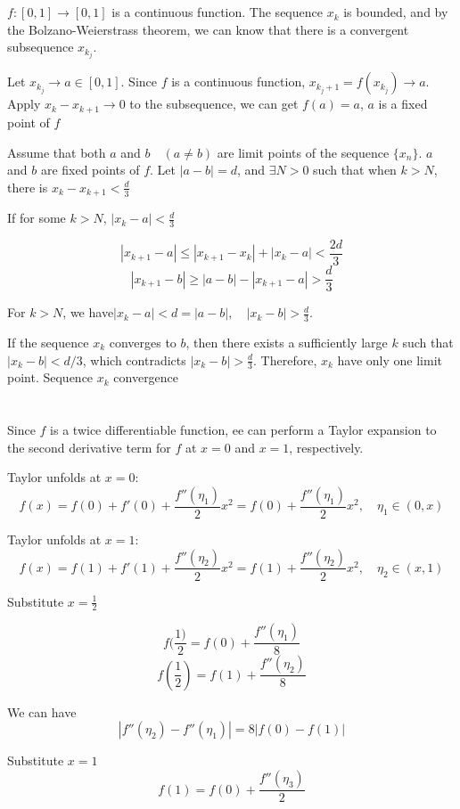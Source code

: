 \documentclass{article}
\begin{document}
\section{}
$f: [0,1] \to [0,1]$ is a continuous function. The sequence $ x_k $ is bounded, and by the Bolzano-Weierstrass theorem, we can know that there is a convergent subsequence $ x_{k_j} $.

Let $ x_{k_j} \rightarrow a \in [0,1]$. Since $f$ is a continuous function, $ x_{k_j+1}=f(x_{k_j})\rightarrow a$. Apply $x_k-x_{k+1}\rightarrow 0$ to the subsequence, we can get $f(a)=a$, $a$ is a fixed point of $f$

Assume that both $ a $ and $ b \quad (a \neq b)$ are limit points of the sequence $\{x_n\}$. $a$ and $b$ are fixed points of $f$. Let $|a-b|=d$, and $\exists N>0$ such that when $k>N$, there is $x_k-x_{k+1}<\frac{d}{3}$

If for some $k>N$, $|x_k-a| <\frac{d}{3} $

$$
|x_{k+1}-a|\leq |x_{k+1}-x_k|+|x_k-a|<\frac{2d}{3}
$$
$$
|x_{k+1}-b|\geq|a-b|- |x_{k+1}-a|>\frac{d}{3}
$$

For $k>N$, we have$|x_k - a| < d = |a - b|, \quad |x_k - b| > \frac{d}{3}$. 

If the sequence $ x_k $ converges to $ b $, then there exists a sufficiently large $ k $ such that $ |x_k - b| < d/3 $, which contradicts $ |x_k - b| > \frac{d}{3} $. Therefore, $ x_k $ have only one limit point. Sequence $x_k$ convergence

\section{}
Since $f$ is a twice differentiable function, ee can perform a Taylor expansion to the second derivative term for $f$ at $x=0$ and $x=1$, respectively.

Taylor unfolds at $x=0$:
$$
f(x)=f(0)+f'(0)+\frac{f''(\eta_1)}{2} x^2=f(0)+\frac{f''(\eta_1)}{2} x^2, \quad \eta_1\in (0,x)
$$

Taylor unfolds at $x=1$:
$$
f(x)=f(1)+f'(1)+\frac{f''(\eta_2)}{2} x^2=f(1)+\frac{f''(\eta_2)}{2} x^2, \quad \eta_2\in (x,1)
$$

Substitute $x = \frac{1}{2}$ 

$$
f( \frac{1)}{2}=f(0)+\frac{f''(\eta_1)}{8} 
$$ 
$$
f( \frac{1}{2})=f(1)+\frac{f''(\eta_2)}{8} 
$$

We can have
$$
|f''(\eta_2)-f''(\eta_1)|=8|f(0)-f(1)|
$$

Substitute $x=1$
$$
f(1)=f(0)+\frac{f''(\eta_3)}{2} 
$$
\end{document}
